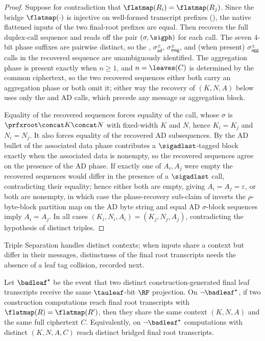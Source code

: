 \begin{proof}
Suppose for contradiction that $\flatmap(R_i) = \flatmap(R_j)$. Since the
bridge $\flatmap(\cdot)$ is injective on well-formed transcript prefixes
(), the native flattened inputs of the two
final-root prefixes are equal. Then 
recovers the full duplex-call sequence and reads off the pair
$(\sigma,\sigph)$ for each call. The seven $4$-bit phase suffixes are
pairwise distinct, so the \siginit, $\sigma_{\mathsf{ad}}^\pm$,
$\sigma_{\mathsf{msg}}^\pm$, and (when present) $\sigma_{\mathsf{agg}}^\pm$
calls in the recovered sequence are unambiguously identified. The
aggregation phase is present exactly when $n \geq 1$, and
$n = \leaves(C)$ is determined by the common ciphertext, so the two
recovered sequences either both carry an aggregation phase or both omit
it; either way the recovery of $(K, N, A)$ below uses only the
\siginit and AD calls, which precede any message or aggregation block.

Equality of the recovered sequences forces equality of the \siginit
call, whose $\sigma$ is $\prfxroot \concat K \concat N$ with
fixed-width $K$ and $N$, hence $K_i = K_j$ and $N_i = N_j$. It also
forces equality of the recovered AD subsequences. By the AD bullet of
 the associated data phase contributes a
$\sigadlast$-tagged block exactly when the associated data is nonempty,
so the recovered sequences agree on the presence of the AD phase. If
exactly one of $A_i, A_j$ were empty the recovered sequences would
differ in the presence of a $\sigadlast$ call, contradicting their
equality; hence either both are empty, giving $A_i = A_j = \varepsilon$,
or both are nonempty, in which case the phase-recovery sub-claim of
 inverts the $\rho$-byte-block partition map on
the AD byte string and equal AD $\sigma$-block sequences imply
$A_i = A_j$. In all cases $(K_i, N_i, A_i) = (K_j, N_j, A_j)$,
contradicting the hypothesis of distinct triples.
\end{proof}

Triple Separation handles distinct contexts; when inputs share a context
but differ in their messages, distinctness of the final root transcripts
needs the absence of a leaf tag collision, recorded next.

\begin{proposition}
\label{prop:final-root-sep}
Let $\badleaf^\star$ be the event that two distinct construction-generated
final leaf transcripts receive the same $\tauleaf$-bit $\RF$ projection.
On $\neg\badleaf^\star$, if two \TW{} construction computations reach
final root transcripts with $\flatmap(R) = \flatmap(R')$, then they share
the same context $(K, N, A)$ and the same full ciphertext $C$.
Equivalently, on $\neg\badleaf^\star$ computations with distinct
$(K, N, A, C)$ reach distinct bridged final root transcripts.
\end{proposition}

